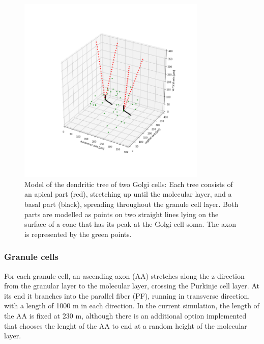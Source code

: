 \documentclass[12pt]{report}
\begin{document}
\begin{figure}[!ht]
	\centering
	\includegraphics[width=0.8\textwidth]{./figures/two_golgi_cells.png}
	\caption{Model of the dendritic tree of two Golgi cells: Each tree consists of an apical part (red), stretching up until the molecular layer, and a basal part (black), spreading throughout the granule cell layer. Both parts are modelled as points on two straight lines lying on the surface of a cone that has its peak at the Golgi cell soma. The axon is represented by the green points.}
	\centering
	\label{f:two_golgis}
\end{figure}




\subsubsection{Granule cells}
For each granule cell, an ascending axon (AA) stretches along the z-direction from the granular layer to the molecular layer, crossing the Purkinje cell layer. At its end it branches into the parallel fiber (PF), running in transverse direction, with a length of 1000 \textmu m in each direction. In the current simulation, the length of the AA is fixed at 230 \textmu m, although there is an additional option implemented that chooses the lenght of the AA to end at a random height of the molecular layer.

\end{document}
